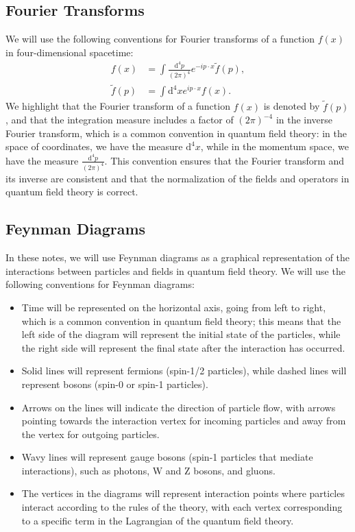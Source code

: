 \subsection*{Fourier Transforms}

We will use the following conventions for Fourier transforms of a function \(f(x)\) in four-dimensional spacetime:
\[
    \begin{aligned}
        f(x)         & = \int \frac{\mathrm{d}^4 p}{(2\pi)^4} e^{-i p \cdot x} \tilde{f}(p), \\
        \tilde{f}(p) & = \int \mathrm{d}^4 x e^{i p \cdot x} f(x).
    \end{aligned}
\]
We highlight that the Fourier transform of a function \(f(x)\) is denoted by \(\tilde{f}(p)\), and that the integration measure includes a factor of \((2\pi)^{-4}\) in the inverse Fourier transform, which is a common convention in quantum field theory: in the space of coordinates, we have the measure \(\mathrm{d}^4 x\), while in the momentum space, we have the measure \(\frac{\mathrm{d}^4 p}{(2\pi)^4}\). This convention ensures that the Fourier transform and its inverse are consistent and that the normalization of the fields and operators in quantum field theory is correct.

\subsection*{Feynman Diagrams}

In these notes, we will use Feynman diagrams as a graphical representation of the interactions between particles and fields in quantum field theory. We will use the following conventions for Feynman diagrams: 
\begin{itemize}
    \item Time will be represented on the horizontal axis, going from left to right, which is a common convention in quantum field theory; this means that the left side of the diagram will represent the initial state of the particles, while the right side will represent the final state after the interaction has occurred.
    \item Solid lines will represent fermions (spin-1/2 particles), while dashed lines will represent bosons (spin-0 or spin-1 particles).
    \item Arrows on the lines will indicate the direction of particle flow, with arrows pointing towards the interaction vertex for incoming particles and away from the vertex for outgoing particles.
    \item Wavy lines will represent gauge bosons (spin-1 particles that mediate interactions), such as photons, W and Z bosons, and gluons.
    \item The vertices in the diagrams will represent interaction points where particles interact according to the rules of the theory, with each vertex corresponding to a specific term in the Lagrangian of the quantum field theory.
\end{itemize}

